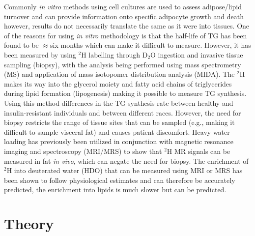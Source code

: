 \documentclass[class=article, crop=false]{standalone}
\begin{document}
Commonly \textit{in vitro} methods using cell cultures are used to assess adipose/lipid turnover and can provide information onto specific adipocyte growth and death\cite{Tchkonia2002FatPreadipocytes} however, results do not necessarily translate the same as it were into tissues. One of the reasons for using \textit{in vitro} methodology is that the half-life of TG has been found to be $\approx$six months\cite{Strawford2004AdiposeO} which can make it difficult to measure. However, it has been measured by using $^2$H labelling through D$_2$O ingestion and invasive tissue sampling (biopsy), with the analysis being performed using mass spectrometry (MS) and application of mass isotopomer distribution analysis (MIDA)\cite{White2019DynamicsDisease, Strawford2004AdiposeO, Belew2022DeTracers, Turner2003MeasurementMIDA}. The $^2$H makes its way into the glycerol moiety and fatty acid chains of triglycerides during lipid formation (lipogenesis) making it possible to measure TG synthesis\cite{Turner2003MeasurementMIDA}. Using this method differences in the TG synthesis rate between healthy and insulin-resistant individuals\cite{Allister2015InHumans} and between different races\cite{White2018RacialHumans}. However, the need for biopsy restricts the range of tissue sites that can be sampled (e.g., making it difficult to sample visceral fat) and causes patient discomfort. Heavy water loading has previously been utilized in conjunction with magnetic resonance imaging and spectroscopy (MRI/MRS) to show that $^2$H MR signals can be measured in fat \textit{in vivo}\cite{Brereton1989TheMice, Cocking2023DeuteriumDosing}, which can negate the need for biopsy. The enrichment of $^2$H into deuterated water (HDO) that can be measured using MRI or MRS has been shown to follow physiological estimates and can therefore be accurately predicted\cite{Cocking2023DeuteriumDosing}, the enrichment into lipids is much slower\cite{White2019DynamicsDisease, Strawford2004AdiposeO} but can be predicted\cite{White2019DynamicsDisease}.

\section{Theory}
\end{document}
